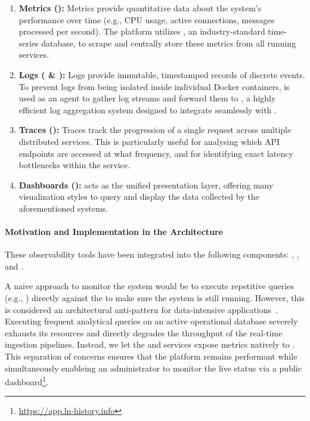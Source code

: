 \begin{enumerate}
    \item \textbf{Metrics ():} 
        Metrics provide quantitative data about the system's performance over time (e.g., CPU usage, active connections, messages processed per second). 
        The platform utilizes , an industry-standard time-series database, to scrape and centrally store these metrics from all running services.

    \item \textbf{Logs ( \& ):} 
        Logs provide immutable, timestamped records of discrete events. 
        To prevent logs from being isolated inside individual Docker containers, 
         is used as an agent to gather log streams and forward them to , 
        a highly efficient log aggregation system designed to integrate seamlessly with .

    \item \textbf{Traces ():} 
        Traces track the progression of a single request across multiple distributed services. 
        This is particularly useful for analysing which API endpoints are accessed at what frequency, 
        and for identifying exact latency bottlenecks within the  service.

    \item \textbf{Dashboards ():} 
         acts as the unified presentation layer, offering many visualization styles
         to query and display the data collected by the aforementioned systems.
\end{enumerate}

\paragraph{Motivation and Implementation in the Architecture}
These observability tools have been integrated into the following components: 
, , and . 

A naive approach to monitor the system would be to execute repetitive queries 
(e.g., ) directly against the  
to make sure the system is still running. 
However, this is considered an architectural anti-pattern for data-intensive applications~\cite[Chapter~3]{kleppmann_designing_2017}. 
Executing frequent analytical queries on an active operational database severely exhausts its resources 
and directly degrades the throughput of the real-time ingestion pipelines. 
Instead, we let the  and  services expose metrics natively to . 
This separation of concerns ensures that the platform remains performant 
while simultaneously enableing an administrator to monitor the live status via a public dashboard\footnote{\url{https://app.ln-history.info}}.



